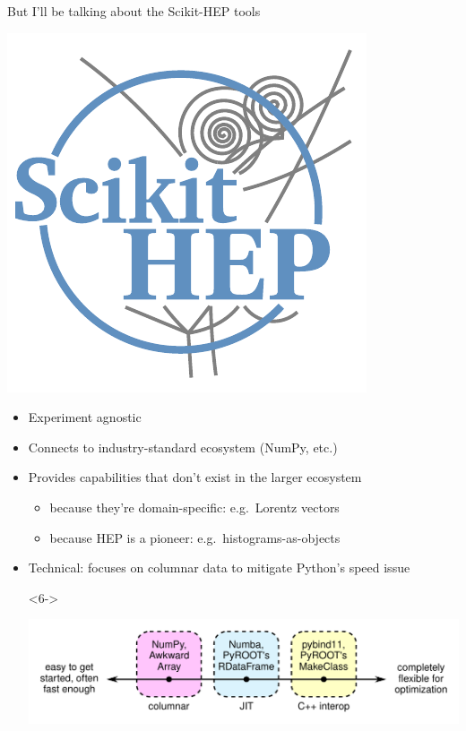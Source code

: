 \documentclass[aspectratio=169]{beamer}
\begin{document}
\begin{frame}{But I'll be talking about the Scikit-HEP tools}
\large

\vspace{0.2 cm}
\hfill \includegraphics[height=3 cm]{scikit-hep-logo.pdf}

\vspace{-2 cm}
\begin{itemize}\setlength{\itemsep}{0.2 cm}
\item<1-> Experiment agnostic
\item<2-> Connects to industry-standard ecosystem (NumPy, etc.)
\item<3-> Provides capabilities that don't exist in the larger ecosystem

\vspace{0.2 cm}
\begin{itemize}\setlength{\itemsep}{0.2 cm}
\item<4-> \normalsize because they're domain-specific: e.g.\ Lorentz vectors
\item<5-> \normalsize because HEP is a pioneer: e.g.\ histograms-as-objects
\end{itemize}

\vspace{0 cm}
\item<6-> Technical: focuses on columnar data to mitigate Python's speed issue

\begin{uncoverenv}<6->
\begin{center}
\includegraphics[width=0.75\linewidth]{ease-vs-flexibility.pdf} \mbox{\hspace{1 cm}}
\end{center}
\end{uncoverenv}
\end{itemize}
\end{frame}
\end{document}
